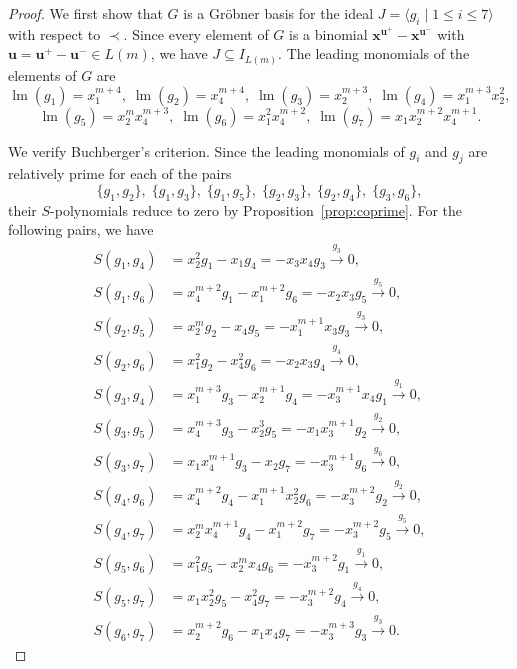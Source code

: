 \documentclass[10pt,a4paper]{amsart}
\begin{document}
\begin{proof} We first show that $G$ is a Gr\"obner basis for the ideal $J=\langle g_{i} \mid 1 \leq i \leq 7 \rangle$ with
respect to $\prec$. Since every element of $G$ is a binomial
$\mathbf x^{\mathbf u^+}-\mathbf x^{\mathbf u^-}$ with
$\mathbf u=\mathbf u^+-\mathbf u^-\in L(m)$, we have $J\subseteq I_{L(m)}$. The leading monomials of the elements of $G$ are
\[
\operatorname{lm}(g_1)=x_1^{m+4},\;
\operatorname{lm}(g_2)=x_4^{m+4},\;
\operatorname{lm}(g_3)=x_2^{m+3},\;
\operatorname{lm}(g_4)=x_1^{m+3}x_2^2, \]
\[\operatorname{lm}(g_5)=x_2^mx_4^{m+3},\;
\operatorname{lm}(g_6)=x_1^2x_4^{m+2},\;
\operatorname{lm}(g_7)=x_1x_2^{m+2}x_4^{m+1}.
\]

We verify Buchberger's criterion. Since the leading monomials of $g_i$ and $g_j$ are relatively prime for
each of the pairs
\[
\{g_1,g_2\},\;
\{g_1,g_3\},\;
\{g_1,g_5\},\;
\{g_2,g_3\},\;
\{g_2,g_4\},\;
\{g_3,g_6\},
\]
their $S$-polynomials reduce to zero by
Proposition~\ref{prop:coprime}. For the following pairs, we have
\[
\begin{aligned}
S(g_1,g_4)&=x_2^2g_1-x_1g_4=-x_3x_4g_3\stackrel{g_3}{\longrightarrow}0,\\
S(g_1,g_6)&=x_4^{m+2}g_1-x_1^{m+2}g_6=-x_2x_3g_5\stackrel{g_5}{\longrightarrow}0,\\
S(g_2,g_5)&=x_2^mg_2-x_4g_5=-x_1^{m+1}x_3g_3\stackrel{g_3}{\longrightarrow}0,\\
S(g_2,g_6)&=x_1^2g_2-x_4^2g_6=-x_2x_3g_4\stackrel{g_4}{\longrightarrow}0,\\
S(g_3,g_4)&=x_1^{m+3}g_3-x_2^{m+1}g_4=-x_3^{m+1}x_4g_1\stackrel{g_1}{\longrightarrow}0,\\
S(g_3,g_5)&=x_4^{m+3}g_3-x_2^3g_5=-x_1x_3^{m+1}g_2\stackrel{g_2}{\longrightarrow}0,\\
S(g_3,g_7)&=x_1x_4^{m+1}g_3-x_2g_7=-x_3^{m+1}g_6\stackrel{g_6}{\longrightarrow}0,\\
S(g_4,g_6)&=x_4^{m+2}g_4-x_1^{m+1}x_2^2g_6=-x_3^{m+2}g_2\stackrel{g_2}{\longrightarrow}0,\\
S(g_4,g_7)&=x_2^mx_4^{m+1}g_4-x_1^{m+2}g_7=-x_3^{m+2}g_5\stackrel{g_5}{\longrightarrow}0,\\
S(g_5,g_6)&=x_1^2g_5-x_2^mx_4g_6=-x_3^{m+2}g_1\stackrel{g_1}{\longrightarrow}0,\\
S(g_5,g_7)&=x_1x_2^2g_5-x_4^2g_7=-x_3^{m+2}g_4\stackrel{g_4}{\longrightarrow}0,\\
S(g_6,g_7)&=x_2^{m+2}g_6-x_1x_4g_7=-x_3^{m+3}g_3\stackrel{g_3}{\longrightarrow}0.
\end{aligned}
\]


\end{proof}
\end{document}
